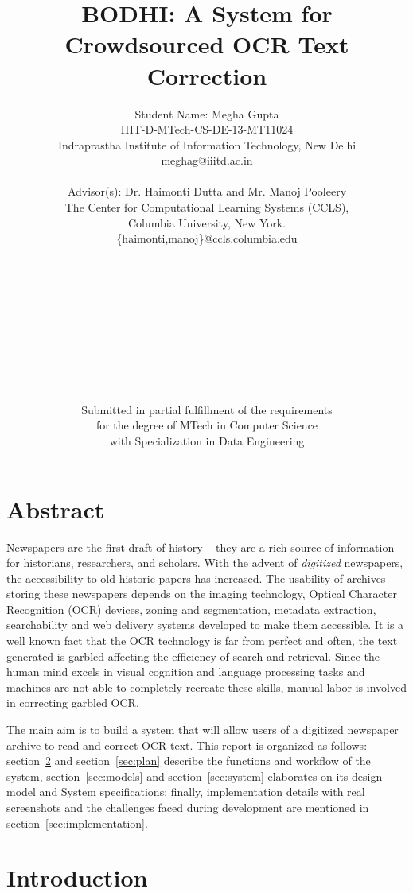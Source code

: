 \documentclass[12pt]{article}
\title{BODHI: A System for Crowdsourced OCR Text Correction}
\author{Student Name: Megha Gupta\\
IIIT-D-MTech-CS-DE-13-MT11024\\
Indraprastha Institute of Information Technology,
New Delhi\\
meghag@iiitd.ac.in
\\ \\
Advisor(s): Dr. Haimonti Dutta and Mr. Manoj Pooleery \\
The Center for Computational Learning Systems (CCLS),\\
Columbia University, New York.\\
\{haimonti,manoj\}@ccls.columbia.edu \\
\\ \\ \\ \\ \\ \\ \\ \\ \\ \\  
Submitted in partial fulfillment of the requirements\\
for the degree of MTech in Computer Science\\
with Specialization in Data Engineering\\}
\begin{document}
\maketitle
\newpage
\section{Abstract}
\label{sec:abstract}
Newspapers are the first draft of history -- they are a rich source of information for historians, researchers, and scholars. With the advent of \emph{digitized} newspapers, the accessibility to old historic papers has increased. The usability of archives storing these newspapers depends on the imaging technology, Optical Character Recognition (OCR) devices, zoning and segmentation, metadata extraction, searchability and web delivery systems developed to make them accessible. It is a well known fact that the OCR technology is far from perfect and often, the text generated is garbled affecting the efficiency of search and retrieval. 
Since the human mind excels in visual cognition and language processing tasks and machines are not able to completely recreate these skills, manual labor is involved in correcting garbled OCR. 

The main aim is to build a system that will allow users of a digitized newspaper archive to read and correct OCR text. This report is organized as follows: section~\ref{sec:intro} and section~\ref{sec:plan} describe the functions and workflow of the system, section~\ref{sec:models} and section~\ref{sec:system} elaborates on its design model and System specifications; finally, implementation details with real screenshots and the challenges faced during development are mentioned in section~\ref{sec:implementation}.

%

\newpage
\tableofcontents

\newpage
\section{Introduction}
\label{sec:intro}
\end{document}
